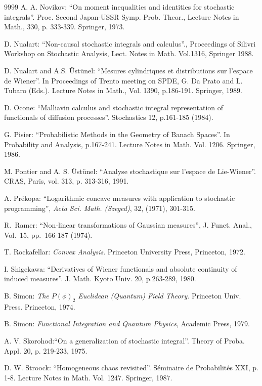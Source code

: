 \documentclass[12pt,a4paper]{book}
\begin{document}
\begin{thebibliography}{9999}
A. A. Novikov: ``On moment inequalities and
identities for stochastic integrals''. Proc. Second Japan-USSR
Symp. Prob. Theor., Lecture Notes in Math., 330, p. 333-339.
Springer, 1973.


D. Nualart: ``Non-causal stochastic integrals and
  calculus''., Proceedings of Silivri Workshop on Stochastic Analysis,
 Lect. Notes in Math. Vol.1316, Springer 1988.


D. Nualart and A.S. \"Ust\"unel: ``Mesures cylindriques et
distributions sur l'espace de Wiener''. In Proceedings of Trento meeting on
 SPDE, G. Da Prato and L. Tubaro (Eds.). Lecture Notes in Math., Vol. 1390,
p.186-191. Springer, 1989.

D. Ocone: ``Malliavin calculus and stochastic integral
  representation of functionals of diffusion processes''. Stochastics
  12, p.161-185 (1984).


 G. Pisier: ``Probabilistic Methods in the Geometry of Banach
Spaces''. In Probability and Analysis, p.167-241. Lecture Notes in Math.
Vol. 1206. Springer, 1986.

M. Pontier and A. S. \"Ust\"unel: ``Analyse stochastique sur
l'espace de Lie-Wiener''. CRAS, Paris, vol. 313, p. 313-316, 1991.

A. Pr\'ekopa:
``Logarithmic concave measures with application to stochastic
programming'',
{\sl Acta Sci. Math. (Szeged)}, 32, (1971), 301-315.

R.~Ramer:
``Non-linear transformations of Gaussian measures'',
J. Funct. Anal., Vol.~15, pp.~166-187 (1974).

T. Rockafellar: {\sl Convex Analysis}. Princeton University Press,
Princeton, 1972.

I. Shigekawa: ``Derivatives of Wiener functionals and
  absolute continuity of induced measures''. J. Math. Kyoto Univ. 20,
  p.263-289, 1980.

B. Simon: {\sl  The $P(\phi)_2$ Euclidean (Quantum) Field
  Theory}. Princeton Univ. Press. Princeton, 1974.

B. Simon:
{\sl Functional Integration and Quantum Physics}, Academic Press, 1979.

A. V. Skorohod:``On a generalization of stochastic
  integral''. Theory of Proba. Appl. 20, p. 219-233, 1975. 



D. W. Stroock: ``Homogeneous  chaos revisited''. S\'eminaire de
Probabilit\'es XXI, p. 1-8. Lecture Notes in
Math. Vol. 1247. Springer, 1987.



\end{thebibliography}
\end{document}
